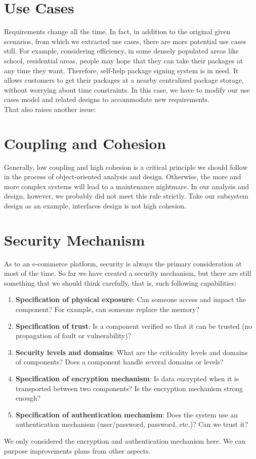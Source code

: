 \documentclass[12pt]{scrreprt}
\begin{document}
\section{Use Cases}
Requirements change all the time. In fact, in addition to the original given scenarios, from which we extracted use cases, there are more potential use cases still. For example, considering efficiency, in some densely populated areas like school, residential areas, people may hope that they can take their packages at any time they want. Therefore, self-help package signing system is in need. It allows customers to get their packages at a nearby centralized package storage, without worrying about time constraints. In this case, we have to modify our use cases model and related designs to accommodate new requirements.\\
That also raises another issue:

\section{Coupling and Cohesion}
Generally, low coupling and high cohesion is a critical principle we should follow in the process of object-oriented analysis and design. Otherwise, the more and more complex systems will lead to a maintenance nightmare. In our analysis and design, however, we probably did not meet this rule strictly. Take our subsystem design as an example, interfaces design is not high cohesion.

\section{Security Mechanism}
As to an e-commerce platform, security is always the primary consideration at most of the time. So far we have created a security mechanism, but there are still something that we should think carefully, that is, such following capabilities:
\begin{enumerate}
	\item \textbf{Specification of physical exposure}: Can someone access and impact the component? For example, can someone replace the memory?
	\item \textbf{Specification of trust}: Is a component verified so that it can be trusted (no propagation of fault or vulnerability)?
	\item \textbf{Security levels and domains}: What are the criticality levels and domains of components? Does a component handle several domains or levels?
	\item \textbf{Specification of encryption mechanism}: Is data encrypted when it is transported between two components? Is the encryption mechanism strong enough?
	\item \textbf{Specification of authentication mechanism}: Does the system use an authentication mechanism (user/password, password, etc.)? Can we trust it?
\end{enumerate}
We only considered the encryption and authentication mechanism here. We can purpose improvements plans from other aspects.
\end{document}

